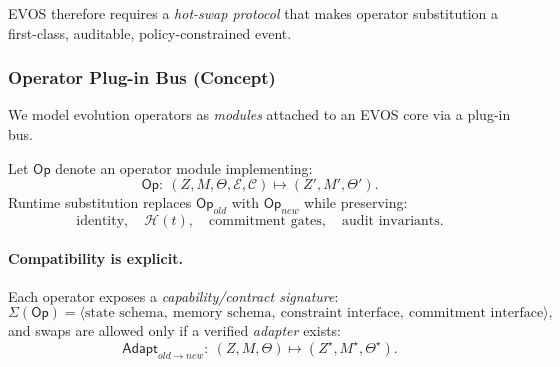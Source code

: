 \documentclass[11pt]{article}
\begin{document}
EVOS therefore requires a \emph{hot-swap protocol} that makes operator substitution
a first-class, auditable, policy-constrained event.

\subsubsection{Operator Plug-in Bus (Concept)}
\label{sec:operator-bus}

We model evolution operators as \emph{modules} attached to an EVOS core via a plug-in bus.

Let $\mathsf{Op}$ denote an operator module implementing:
\[
\mathsf{Op}:\ (Z,M,\Theta,\mathcal{E},\mathcal{C}) \mapsto (Z',M',\Theta').
\]
Runtime substitution replaces $\mathsf{Op}_{old}$ with $\mathsf{Op}_{new}$ while preserving:
\[
\text{identity},\quad \mathcal{H}(t),\quad \text{commitment gates},\quad \text{audit invariants}.
\]

\paragraph{Compatibility is explicit.}
Each operator exposes a \emph{capability/contract signature}:
\[
\Sigma(\mathsf{Op}) = \langle \text{state schema},\ \text{memory schema},\ \text{constraint interface},\ \text{commitment interface} \rangle,
\]
and swaps are allowed only if a verified \emph{adapter} exists:
\[
\mathsf{Adapt}_{old\rightarrow new}:\ (Z,M,\Theta) \mapsto (Z^\star,M^\star,\Theta^\star).
\]
\end{document}
